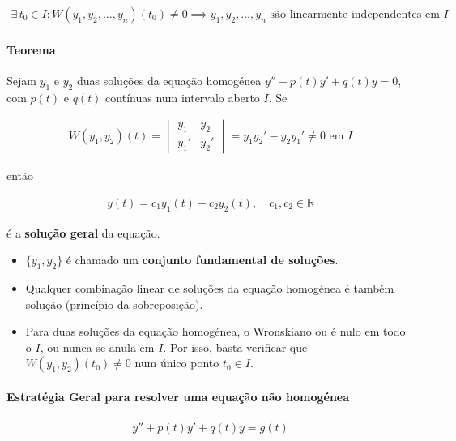 \documentclass{article}
\begin{document}
\begin{gather*}
\boxed{\exists \, t_0 \in I : W(y_1, y_2, \ldots, y_n)(t_0) \neq 0 \implies y_1, y_2, \ldots, y_n
\text{ são linearmente independentes em } I}
\end{gather*}

\paragraph{Teorema}

Sejam $y_1$ e $y_2$ duas soluções da equação homogénea $y'' + p(t)y' + q(t)y = 0$, com $p(t)$ e $q(t)$
contínuas num intervalo aberto $I$. Se

\begin{gather*}
W(y_1, y_2)(t) =
\begin{vmatrix}
y_1 & y_2 \\
y_1' & y_2'
\end{vmatrix}
= y_1 y_2' - y_2 y_1' \neq 0 \text{ em } I
\end{gather*}

então

\begin{gather*}
\boxed{y(t) = c_1 y_1(t) + c_2 y_2(t), \quad c_1, c_2 \in \mathbb{R}}
\end{gather*}

é a \textbf{solução geral} da equação.

\begin{itemize}
    \item $\{y_1, y_2\}$ é chamado um \textbf{conjunto fundamental de soluções}.
    \item Qualquer combinação linear de soluções da equação homogénea é também solução
    (princípio da sobreposição).
    \item Para duas soluções da equação homogénea, o Wronskiano ou é nulo em todo o $I$, ou nunca se anula
    em $I$. Por isso, basta verificar que $W(y_1, y_2)(t_0) \neq 0$ num único ponto $t_0 \in I$.
\end{itemize}

\paragraph{Estratégia Geral para resolver uma equação não homogénea}

\begin{gather*}
\boxed{y'' + p(t)y' + q(t)y = g(t)}
\end{gather*}
\end{document}
